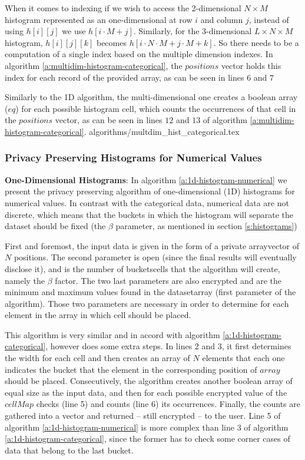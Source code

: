 When it comes to indexing if we wish to access the 2-dimensional $N \times M$ histogram represented as an one-dimensional at row $ i $ and column $ j $, instead of using $h[i][j]$ we use $h[i \cdot M + j]$.
Similarly, for the 3-dimensional $L \times N \times M$ histogram, $h[i][j][k]$ becomes $h[i \cdot N \cdot M + j \cdot M + k]$. So there needs to be a computation of a single index based on the multiple dimension indexes. In algorithm \ref{a:multidim-histogram-categorical}, the $positions$ vector holds this index for each record of the provided array, as can be seen in lines $ 6 $ and $ 7 $

Similarly to the 1D algorithm, the multi-dimensional one creates a boolean array ($eq$) for each possible histogram cell, which counts the occurrences of that cell in the $positions$ vector, as can be seen in lines $12$ and $13$ of algorithm \ref{a:multidim-histogram-categorical}.
{algorithms/multdim_hist_categorical.tex}



\subsubsection{Privacy Preserving Histograms for Numerical Values}\label{sss:histogram-numerical}

\textbf{One-Dimensional Histograms}: In algorithm \ref{a:1d-histogram-numerical} we present the privacy preserving algorithm of one-dimensional (1D) histograms for numerical values.
In contrast with the categorical data, numerical data are not discrete, which means that the buckets in which the histogram will separate the dataset should be fixed (the $\beta$ parameter, as mentioned in section \ref{s:histograms})

First and foremost, the input data is given in the form of a private array\myslash vector of $N$ positions.
The second parameter is open (since the final results will eventually disclose it), and is the number of buckets\myslash cells that the algorithm will create, namely the $\beta$ factor.
The two last parameters are also encrypted and are the minimum and maximum values found in the dataset\myslash array (first parameter of the algorithm).
Those two parameters are necessary in order to determine for each element in the array in which cell should be placed.

This algorithm is very similar and in accord with algorithm \ref{a:1d-histogram-categorical}, however does some extra steps.
In lines 2 and 3, it first determines the width for each cell and then creates an array of $N$ elements that each one indicates the bucket that the element in the corresponding position of $array$ should be placed.
Consecutively, the algorithm creates another boolean array of equal size as the input data, and then for each possible encrypted value of the $cellMap$ checks (line 5) and counts (line 6) its occurrences.
Finally, the counts are gathered into a vector and returned -- still encrypted -- to the user.
Line 5 of algorithm \ref{a:1d-histogram-numerical} is more complex than line 3 of algorithm \ref{a:1d-histogram-categorical}, since the former has to check some corner cases of data that belong to the last bucket.

